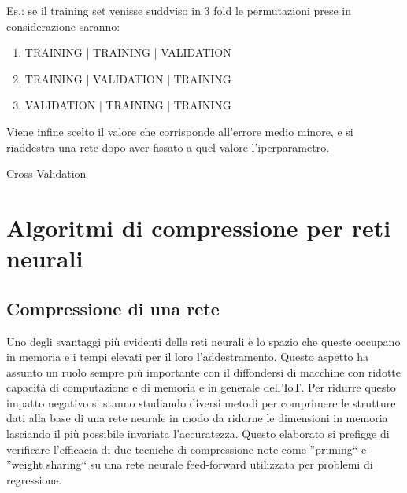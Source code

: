 \documentclass[12pt]{report}
\begin{document}
Es.: se il training set venisse suddviso in 3 fold le permutazioni prese in considerazione saranno:
\begin{enumerate}
\item{TRAINING | TRAINING | VALIDATION}
\item{TRAINING | VALIDATION | TRAINING}
\item{VALIDATION | TRAINING | TRAINING}
\end{enumerate}

Viene infine scelto il valore che corrisponde all'errore medio minore, e si riaddestra una rete dopo aver fissato a quel valore l'iperparametro.

\makeatletter
\def\BState{\State\hskip-\ALG@thistlm}
\makeatother

\begin{algorithm}
\caption{Cross Validation}
\end{algorithm}

\chapter{Algoritmi di compressione per reti neurali}

\section{Compressione di una rete}

Uno degli svantaggi più evidenti delle reti neurali è lo spazio che queste occupano in memoria e i tempi elevati per il loro l’addestramento. Questo aspetto ha assunto un ruolo sempre più importante con il diffondersi di macchine con ridotte capacità di computazione e di memoria e in generale dell’IoT. 
Per ridurre questo impatto negativo si stanno studiando diversi metodi per comprimere le strutture dati alla base di una rete neurale in modo da ridurne le dimensioni in memoria lasciando il più possibile invariata l’accuratezza. Questo elaborato si prefigge di verificare l'efficacia di due tecniche di compressione note come ''pruning`` e ''weight sharing`` su una rete neurale feed-forward utilizzata per problemi di regressione.
\end{document}
